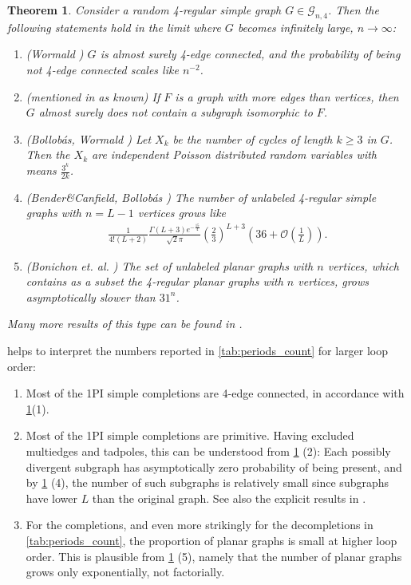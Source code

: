 \documentclass[11pt,a4paper]{article}
\newtheorem{theorem}{Theorem}
\renewcommand{\|}{\rule[-0.4ex]{0.2ex}{1.2em}}
\begin{document}
\begin{theorem}\label{thm:random_graphs}
	Consider a random 4-regular simple graph  $G \in \mathcal{G}_{n,4}$. 
	Then the  following statements  hold in the limit where $G$ becomes infinitely large, $n\rightarrow \infty$:
\begin{enumerate}
	\item (Wormald  \cite{wormald_asymptotic_1981,bollobas_random_2001})  $G$ is almost surely 4-edge connected, and the probability of being not 4-edge connected scales like $n^{-2}$.
	\item (mentioned in \cite{wormald_models_1999} as known) If $F$ is a graph with more edges than vertices, then   $G$ almost surely does not contain a subgraph isomorphic to $F$. 
	\item (Bollobás, Wormald  \cite{bollobas_probabilistic_1980,wormald_asymptotic_1981a}) Let $X_{k}$ be the number of cycles of length $k\geq 3$ in  $G$. Then  the $X_k$ are independent Poisson distributed random variables with means $\frac{3^k}{2k}$.
	\item (Bender\&Canfield, Bollobás \cite{bender_asymptotic_1978,bollobas_probabilistic_1980,bollobas_asymptotic_1982}) The number  of  unlabeled 4-regular simple graphs with $n=L-1$ vertices  grows like
	\begin{align*}
	 \frac{1}{4! (L+2)}\frac{\Gamma(L+3) e^{-\frac{15}{4}}}{\sqrt 2 \pi }\left( \frac 2 3 \right) ^{L+3} \left( 36+ \mathcal O \left( \frac 1 L \right)   \right) . 
	\end{align*}
	\item (Bonichon et. al. \cite{bonichon_planar_2006}) The set of unlabeled planar graphs with $n$ vertices, which contains as a subset the 4-regular planar graphs with $n$ vertices, grows asymptotically slower than $31^n$.
\end{enumerate}
Many more results of this type can be found in \cite{wormald_models_1999}.
\end{theorem}


\noindent
{} helps to interpret the numbers  reported in \cref{tab:periods_count} for larger loop order:
\begin{enumerate}
	\item Most of the 1PI simple completions are 4-edge connected, in accordance with \cref{thm:random_graphs}(1).
	\item Most of the 1PI simple completions are primitive. Having excluded multiedges and tadpoles, this can be understood from \cref{thm:random_graphs} (2): Each possibly divergent subgraph has asymptotically zero probability of being present, and by \cref{thm:random_graphs} (4), the number of such subgraphs is relatively small since subgraphs have lower  $L$ than the original graph. See also the explicit results in \cite{cvitanovic_number_1978,borinsky_renormalized_2017}.
	\item For the completions, and even more strikingly for the decompletions in \cref{tab:periods_count}, the proportion of planar graphs is small at higher loop order. This is plausible  from   \cref{thm:random_graphs} (5), namely that the number of planar graphs grows only exponentially, not factorially.
\end{enumerate}
\end{document}
